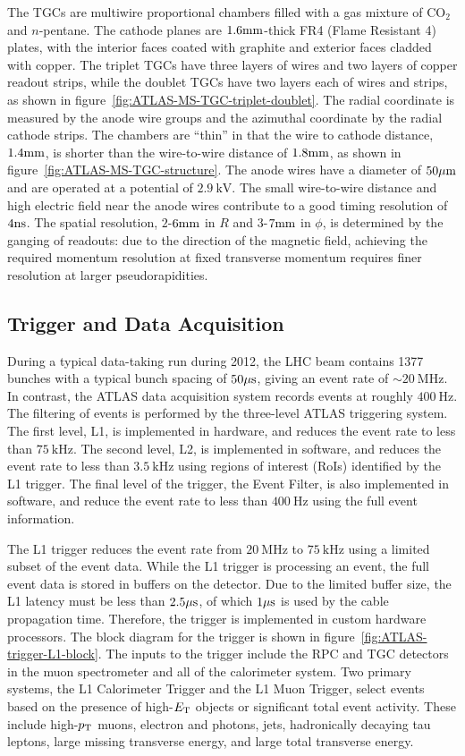 The TGCs are multiwire proportional chambers filled with a gas mixture of CO$_2$ and $n$-pentane. The cathode planes are $1.6 \mathrm{mm}$-thick FR4 (Flame Resistant 4) plates, with the interior faces coated with graphite and exterior faces cladded with copper. The triplet TGCs have three layers of wires and two layers of copper readout strips, while the doublet TGCs have two layers each of wires and strips, as shown in figure~\ref{fig:ATLAS-MS-TGC-triplet-doublet}. The radial coordinate is measured by the anode wire groups and the azimuthal coordinate by the radial cathode strips. The chambers are ``thin'' in that the wire to cathode distance, $1.4 \mathrm{mm}$, is shorter than the wire-to-wire distance of $1.8 \mathrm{mm}$, as shown in figure~\ref{fig:ATLAS-MS-TGC-structure}. The anode wires have a diameter of $50 \mu\mathrm{m}$ and are operated at a potential of $2.9~\mbox{kV}$. The small wire-to-wire distance and high electric field near the anode wires contribute to a good timing resolution of $4 \mathrm{ns}$. The spatial resolution, $2$-$6 \mathrm{mm}$ in $R$ and $3$-$7 \mathrm{mm}$ in $\phi$, is determined by the ganging of readouts: due to the direction of the magnetic field, achieving the required momentum resolution at fixed transverse momentum requires finer resolution at larger pseudorapidities. 


\subsection{Trigger and Data Acquisition}
During a typical data-taking run during 2012, the LHC beam contains 1377 bunches with a typical bunch spacing of $50 \mu\mathrm{s}$, giving an event rate of $\sim 20~\mbox{MHz}$. In contrast, the ATLAS data acquisition system records events at roughly $400~\mbox{Hz}$. The filtering of events is performed by the three-level ATLAS triggering system. The first level, L1, is implemented in hardware, and reduces the event rate to less than $75~\mbox{kHz}$. The second level, L2, is implemented in software, and reduces the event rate to less than $3.5~\mbox{kHz}$ using regions of interest (RoIs) identified by the L1 trigger. The final level of the trigger, the Event Filter, is also implemented in software, and reduce the event rate to less than $400~\mbox{Hz}$ using the full event information. 

The L1 trigger reduces the event rate from $20~\mbox{MHz}$ to $75~\mbox{kHz}$ using a limited subset of the event data. While the L1 trigger is processing an event, the full event data is stored in buffers on the detector. Due to the limited buffer size, the L1 latency must be less than $2.5 \mu\mathrm{s}$, of which $1 \mu\mathrm{s}$ is used by the cable propagation time. Therefore, the trigger is implemented in custom hardware processors. The block diagram for the trigger is shown in figure~\ref{fig:ATLAS-trigger-L1-block}. The inputs to the trigger include the RPC and TGC detectors in the muon spectrometer and all of the calorimeter system.  Two primary systems, the L1 Calorimeter Trigger and the L1 Muon Trigger, select events based on the presence of high-$E_{\mathrm{T}}$ objects or significant total event activity. These include high-$p_{\text{T}}$ muons, electron and photons, jets, hadronically decaying tau leptons, large missing transverse energy, and large total transverse energy. 

